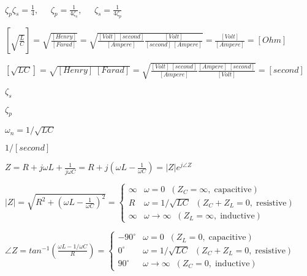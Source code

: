 \documentclass{article}
\def\lthtmlcheckvsize{\ifdim\ht\sizebox<\vsize 
  \ifdim\wd\sizebox<\hsize\expandafter\hfill\fi \expandafter\vfill
  \else\expandafter\vss\fi}%
\begin{document}
{\newpage\clearpage
{}%
$\displaystyle \zeta_p \zeta_s=\frac{1}{4},\;\;\;\;\;\zeta_p=\frac{1}{4\zeta_s},
\;\;\;\;\;\zeta_s=\frac{1}{4\zeta_p}$%
\lthtmlindisplaymathZ
\lthtmlcheckvsize\clearpage}

{\newpage\clearpage
{}%
$\displaystyle \left[\sqrt{\frac{L}{C}}\right]=\sqrt{\frac{[Henry]}{[Farad]}}
=\sqrt{\frac{[Volt]\;[second]}{[Ampere]}\frac{[Volt]}{[second]\;[Ampere]}}
=\frac{[Volt]}{[Ampere]}=[Ohm]$%
\lthtmlindisplaymathZ
\lthtmlcheckvsize\clearpage}

{\newpage\clearpage
{}%
$\displaystyle \left[ \sqrt{LC} \right]=\sqrt{[Henry]\;[Farad]}
=\sqrt{\frac{[Volt]\;[second]}{[Ampere]}\frac{[Ampere]\;[second]}{[Volt]}}
=[second]$%
\lthtmlindisplaymathZ
\lthtmlcheckvsize\clearpage}

{\newpage\clearpage
{}%
$ \zeta_s$%
\lthtmlindisplaymathZ
\lthtmlcheckvsize\clearpage}

{\newpage\clearpage
{}%
$ \zeta_p$%
\lthtmlindisplaymathZ
\lthtmlcheckvsize\clearpage}

{\newpage\clearpage
{}%
$ \omega_n=1/\sqrt{LC}$%
\lthtmlindisplaymathZ
\lthtmlcheckvsize\clearpage}

{\newpage\clearpage
{}%
$ 1/[second]$%
\lthtmlindisplaymathZ
\lthtmlcheckvsize\clearpage}

{\newpage\clearpage
{}%
$\displaystyle Z=R+j\omega L+\frac{1}{j\omega C}=R+j\left(\omega L-\frac{1}{\omega C}\right)
=|Z|e^{j\angle Z}$%
\lthtmlindisplaymathZ
\lthtmlcheckvsize\clearpage}

{\newpage\clearpage
{}%
$\displaystyle |Z|=\sqrt{R^2+\left(\omega L-\frac{1}{\omega C}\right)^2}
=\left\{ \begin{array}{rl}
\infty & \omega=0\;\; (Z_C=\infty,\;\mbox{capacitive})\\
R & \omega=1/\sqrt{LC}\;\; (Z_C+Z_L=0,\;\mbox{resistive})\\
\infty & \omega \rightarrow \infty\;\; (Z_L=\infty,\;\mbox{inductive})
\end{array} \right.$%
\lthtmlindisplaymathZ
\lthtmlcheckvsize\clearpage}

{\newpage\clearpage
{}%
$\displaystyle \angle Z=tan^{-1} \left(\frac{\omega L-1/\omega C}{R}\right)
=\left\{ \begin{array}{rl} -90^\circ & \omega=0\;\; (Z_L=0,\;\mbox{capacitive})\\
0^\circ & \omega=1/\sqrt{LC}\;\; (Z_C+Z_L=0,\;\mbox{resistive})\\
90^\circ & \omega \rightarrow \infty\;\; (Z_C=0,\;\mbox{inductive})
\end{array} \right.$%
\lthtmlindisplaymathZ
\lthtmlcheckvsize\clearpage}
\end{document}
